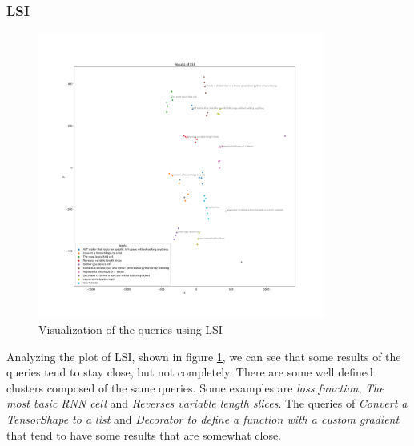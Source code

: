 \documentclass [14 pt]{article}
\begin{document}
\subsubsection{LSI}
\begin{figure}[H]
\centering
\includegraphics[width=0.84\textwidth]{../res/lsi.png}
\caption{Visualization of the queries using LSI}\label{fig:lsi}
\end{figure}
Analyzing the plot of LSI, shown in figure \ref{fig:lsi}, we can see that some results of the queries tend to stay close, but not completely. There are some well defined clusters composed of the same queries. Some examples are \emph{loss function}, \emph{The most basic RNN cell} and \emph{Reverses variable length slices}. 
The queries of \emph{Convert a TensorShape to a list} and \emph{Decorator to define a function with a custom gradient} that tend to have some results that are somewhat close.
\end{document}
